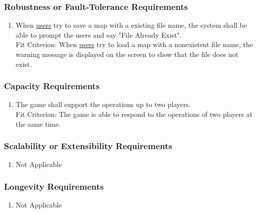 \documentclass[12pt, titlepage]{article}
\begin{document}
\subsubsection{Robustness or Fault-Tolerance Requirements}
\label{ssub:robustness_or_fault_tolerance_requirements}
\begin{enumerate}[{PR}7. ]
	\item When \underline{users} try to save a map with a existing file name, the system shall be able to prompt the users and say "File Already Exist".
	\\
	
	Fit Criterion: When \underline{users} try to load a map with a nonexistent file name, the warning message is displayed on the screen to show that the file does not exist.
\end{enumerate}

\subsubsection{Capacity Requirements}
\label{ssub:capacity_requirements}
\begin{enumerate}[{PR}9. ]
	\item The game shall support the operations up to two players.
	\\
	
	Fit Criterion: The game is able to respond to the operations of two players at the same time.
\end{enumerate}

\subsubsection{Scalability or Extensibility Requirements}
\label{ssub:scalability_or_extensibility_requirements}
\begin{enumerate}[{PR}10. ]
	\item Not Applicable
\end{enumerate}

\subsubsection{Longevity Requirements}
\label{ssub:longevity_requirements}
\begin{enumerate}[{PR}11. ]
	\item Not Applicable
\end{enumerate}
\end{document}
